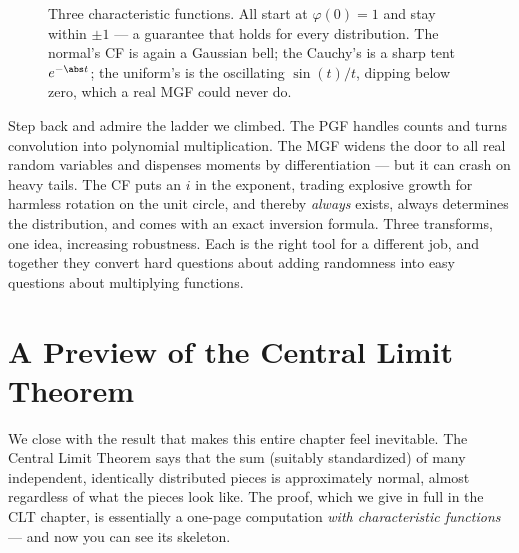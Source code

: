 \begin{figure}[H]
\centering
{}
\caption{Three characteristic functions. All start at $\varphi(0)=1$ and stay
within $\pm 1$ --- a guarantee that holds for every distribution. The normal's
CF is again a Gaussian bell; the Cauchy's is a sharp tent $e^{-\abs t}$; the
uniform's is the oscillating $\sin(t)/t$, dipping below zero, which a real MGF
could never do.}
\label{ch18:fig-cf}
\end{figure}

\begin{aestheticbox}
Step back and admire the ladder we climbed. The PGF handles counts and turns
convolution into polynomial multiplication. The MGF widens the door to all real
random variables and dispenses moments by differentiation --- but it can crash
on heavy tails. The CF puts an $i$ in the exponent, trading explosive growth for
harmless rotation on the unit circle, and thereby \emph{always} exists, always
determines the distribution, and comes with an exact inversion formula. Three
transforms, one idea, increasing robustness. Each is the right tool for a
different job, and together they convert hard questions about adding randomness
into easy questions about multiplying functions.
\end{aestheticbox}

\section{A Preview of the Central Limit Theorem}
\label{ch18:clt-preview}

We close with the result that makes this entire chapter feel inevitable. The
Central Limit Theorem says that the sum (suitably standardized) of many
independent, identically distributed pieces is approximately normal, almost
regardless of what the pieces look like. The proof, which we give in full in the
CLT chapter, is essentially a one-page computation \emph{with characteristic
functions} --- and now you can see its skeleton.

